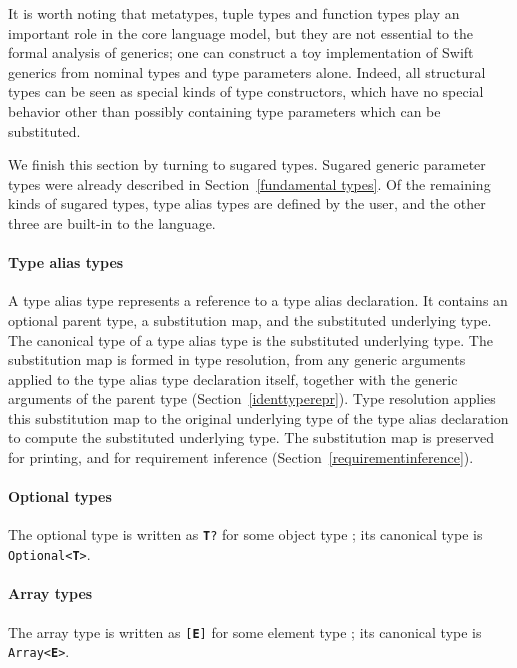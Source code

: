\documentclass[../generics]{subfiles}
\begin{document}
\medskip

It is worth noting that metatypes, tuple types and function types play an important role in the core language model, but they are not essential to the formal analysis of generics; one can construct a toy implementation of Swift generics from nominal types and type parameters alone. Indeed, all structural types can be seen as special kinds of type constructors, which have no special behavior other than possibly containing type parameters which can be substituted.

\medskip

We finish this section by turning to sugared types. Sugared generic parameter types were already described in Section~\ref{fundamental types}. Of the remaining kinds of sugared types, type alias types are defined by the user, and the other three are built-in to the language.

\paragraph{Type alias types} A type alias type represents a reference to a type alias declaration. It contains an optional parent type, a substitution map, and the substituted underlying type. The canonical type of a type alias type is the substituted underlying type. The substitution map is formed in type resolution, from any generic arguments applied to the type alias type declaration itself, together with the generic arguments of the parent type (Section~\ref{identtyperepr}). Type resolution applies this substitution map to the original underlying type of the type alias declaration to compute the substituted underlying type. The substitution map is preserved for printing, and for requirement inference (Section~\ref{requirementinference}).

\paragraph{Optional types} The optional type is written as \texttt{\textbf{T}?} for some object type \T; its canonical type is \texttt{Optional<\textbf{T}>}.

\paragraph{Array types} The array type is written as \texttt{[\textbf{E}]} for some element type ; its canonical type is \texttt{Array<\textbf{E}>}.
\end{document}
